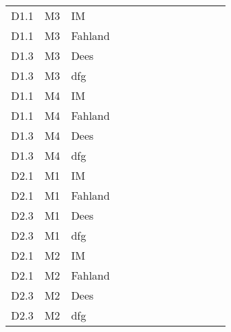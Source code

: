 \begin{table}[]
{\begin{tabular}{lll|llllllll|ll}
			D1.1      & M3              & IM  &     &    &     &     &        &           &          &      &                   &                     \\
			D1.1      & M3              & Fahland   &     &    &     &     &        &           &          &      &                   &                     \\
			D1.3      & M3              & Dees      &     &    &     &     &        &           &          &      &                   &                     \\
			D1.3      & M3              & dfg       &     &    &     &     &        &           &          &      &                   &                     \\
			D1.1      & M4              & IM  &     &    &     &     &        &           &          &      &                   &                     \\
			D1.1      & M4              & Fahland   &     &    &     &     &        &           &          &      &                   &                     \\
			D1.3      & M4              & Dees      &     &    &     &     &        &           &          &      &                   &                     \\
			D1.3      & M4              & dfg       &     &    &     &     &        &           &          &      &                   &                     \\
			D2.1      & M1              & IM &     &    &     &     &        &           &          &      &                   &                     \\
			D2.1      & M1              & Fahland   &     &    &     &     &        &           &          &      &                   &                     \\
			D2.3      & M1              & Dees      &     &    &     &     &        &           &          &      &                   &                     \\
			D2.3      & M1              & dfg       &     &    &     &     &        &           &          &      &                   &                     \\
			D2.1      & M2              & IM  &     &    &     &     &        &           &          &      &                   &                     \\
			D2.1      & M2              & Fahland   &     &    &     &     &        &           &          &      &                   &                     \\
			D2.3      & M2              & Dees      &     &    &     &     &        &           &          &      &                   &                     \\
			D2.3      & M2              & dfg       &     &    &     &     &        &           &          &      &                   &                    
		\end{tabular}}
	
	\end{table}
